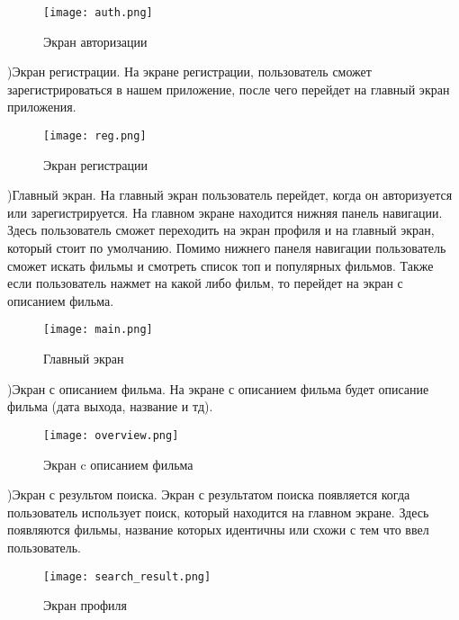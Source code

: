 \begin{figure}[h!]
\centering
\texttt{[image: auth.png]}
\caption{Экран авторизации}
\label{fig:auth}
\end{figure}
)Экран регистрации. На экране регистрации, пользователь сможет зарегистрироваться в нашем приложение, после чего перейдет на главный экран приложения.
\begin{figure}[h!]
\centering
\texttt{[image: reg.png]}
\caption{Экран регистрации}
\label{fig:reg}
\end{figure}
)Главный экран. На главный экран пользователь перейдет, когда он авторизуется или зарегистрируется. На главном экране находится нижняя панель навигации. Здесь пользователь сможет переходить на экран профиля и на главный экран, который стоит по умолчанию. Помимо нижнего панеля навигации пользователь сможет искать фильмы и смотреть список топ и популярных фильмов. Также если пользователь нажмет на какой либо фильм, то перейдет на экран с описанием фильма.
\begin{figure}[h!]
\centering
\texttt{[image: main.png]}
\caption{Главный экран}
\label{fig:main}
\end{figure}
)Экран с описанием фильма. На экране с описанием фильма будет описание фильма (дата выхода, название и тд).
\begin{figure}[h!]
\centering
\texttt{[image: overview.png]}
\caption{Экран c описанием фильма}
\label{fig:overview}
\end{figure}

)Экран с результом поиска. Экран с результатом поиска появляется когда пользователь использует поиск, который находится на главном экране. Здесь появляются фильмы, название которых идентичны или схожи с тем что ввел пользователь.
\begin{figure}[h!]
\centering
\texttt{[image: search\_result.png]}
\caption{Экран профиля}
\label{fig:profile}
\end{figure}

